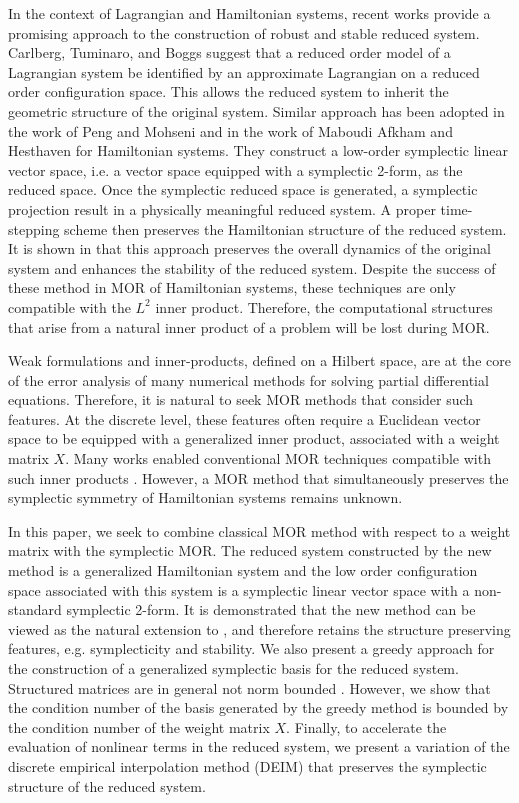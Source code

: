 In the context of Lagrangian and Hamiltonian systems, recent works provide a promising approach to the construction of robust and stable reduced system. Carlberg, Tuminaro, and Boggs \cite{Carlberg:2014ky} suggest that a reduced order model of a Lagrangian system be identified by an approximate Lagrangian on a reduced order configuration space. This allows the reduced system to inherit the geometric structure of the original system. Similar approach has been adopted in the work of Peng and Mohseni \cite{doi:10.1137/140978922} and in the work of Maboudi Afkham and Hesthaven \cite{doi:10.1137/17M1111991} for Hamiltonian systems. They construct a low-order symplectic linear vector space, i.e. a vector space equipped with a symplectic 2-form, as the reduced space. Once the symplectic reduced space is generated, a symplectic projection result in a physically meaningful reduced system. A proper time-stepping scheme then preserves the Hamiltonian structure of the reduced system. It is shown in \cite{doi:10.1137/17M1111991,doi:10.1137/140978922} that this approach preserves the overall dynamics of the original system and enhances the stability of the reduced system. Despite the success of these method in MOR of Hamiltonian systems, these techniques are only compatible with the $L^2$ inner product. Therefore, the computational structures that arise from a natural inner product of a problem will be lost during MOR.

Weak formulations and inner-products, defined on a Hilbert space, are at the core of the error analysis of many numerical methods for solving partial differential equations. Therefore, it is natural to seek MOR methods that consider such features. At the discrete level, these features often require a Euclidean vector space to be equipped with a generalized inner product, associated with a weight matrix $X$. Many works enabled conventional MOR techniques compatible with such inner products \cite{sen2006natural}. However, a MOR method that simultaneously preserves the symplectic symmetry of Hamiltonian systems remains unknown. 

In this paper, we seek to combine classical MOR method with respect to a weight matrix with the symplectic MOR. The reduced system constructed by the new method is a generalized Hamiltonian system and the low order configuration space associated with this system is a symplectic linear vector space with a non-standard symplectic 2-form. It is demonstrated that the new method can be viewed as the natural extension to \cite{doi:10.1137/17M1111991}, and therefore retains the structure preserving features, e.g. symplecticity and stability. We also present a greedy approach for the construction of a generalized symplectic basis for the reduced system. Structured matrices are in general not norm bounded \cite{Karow:2006cf}. However, we show that the condition number of the basis generated by the greedy method is bounded by the condition number of the weight matrix $X$. Finally, to accelerate the evaluation of nonlinear terms in the reduced system, we present a variation of the discrete empirical interpolation method (DEIM) that preserves the symplectic structure of the reduced system.

